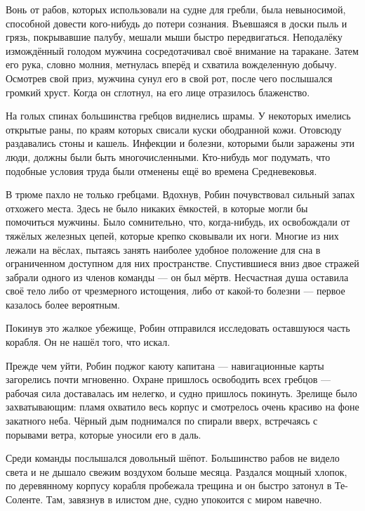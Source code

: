 \documentclass[a4paper,12pt]{book}
\begin{document}
\par
Вонь от рабов, которых использовали на судне для гребли, была невыносимой, способной довести кого-нибудь до потери сознания. Въевшаяся в доски пыль и грязь, покрывавшие палубу, мешали мыши быстро передвигаться. Неподалёку измождённый голодом мужчина сосредотачивал своё внимание на таракане. Затем его рука, словно молния, метнулась вперёд и схватила вожделенную добычу. Осмотрев свой приз, мужчина сунул его в свой рот, после чего послышался громкий хруст. Когда он сглотнул, на его лице отразилось блаженство.
\par
На голых спинах большинства гребцов виднелись шрамы. У некоторых имелись открытые раны, по краям которых свисали куски ободранной кожи. Отовсюду раздавались стоны и кашель. Инфекции и болезни, которыми были заражены эти люди, должны были быть многочисленными. Кто-нибудь мог подумать, что подобные условия труда были отменены ещё во времена Средневековья.
\par
В трюме пахло не только гребцами. Вдохнув, Робин почувствовал сильный запах отхожего места. Здесь не было никаких ёмкостей, в которые могли бы помочиться мужчины. Было сомнительно, что, когда-нибудь, их освобождали от тяжёлых железных цепей, которые крепко сковывали их ноги. Многие из них лежали на вёслах, пытаясь занять наиболее удобное положение для сна в ограниченном доступном для них пространстве. Спустившиеся вниз двое стражей забрали одного из членов команды — он был мёртв. Несчастная душа оставила своё тело либо от чрезмерного истощения, либо от какой-то болезни — первое казалось более вероятным.\\
\par
Покинув это жалкое убежище, Робин отправился исследовать оставшуюся часть корабля. Он не нашёл того, что искал.
\par
Прежде чем уйти, Робин поджог каюту капитана — навигационные карты загорелись почти мгновенно. Охране пришлось освободить всех гребцов — рабочая сила доставалась им нелегко, и судно пришлось покинуть. Зрелище было захватывающим: пламя охватило весь корпус и смотрелось очень красиво на фоне закатного неба. Чёрный дым поднимался по спирали вверх, встречаясь с порывами ветра, которые уносили его в даль.
\par
Среди команды послышался довольный шёпот. Большинство рабов не видело света и не дышало свежим воздухом больше месяца. Раздался мощный хлопок, по деревянному корпусу корабля пробежала трещина и он быстро затонул в Те-Соленте. Там, завязнув в илистом дне, судно упокоится с миром навечно.
\par
\end{document}
